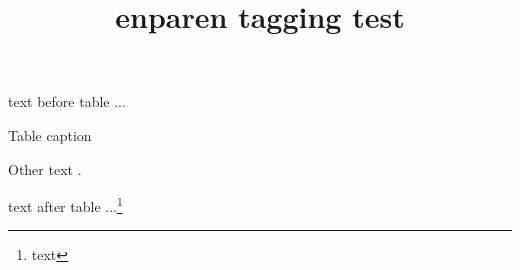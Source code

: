 \documentclass{article}
\title{enparen tagging test}
\begin{document}

\enparenLeft text before table ...
\begin{table}
\caption{Table caption }
Other text .
\end{table}
text after table ...\footnote{text }
\enparenRight
\end{document}
